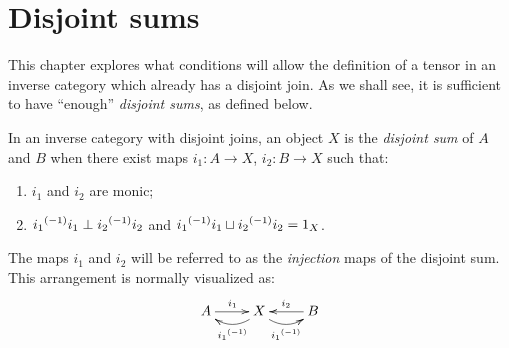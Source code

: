 \section{Disjoint sums} %
\label{sub:disjoint_sums}

This chapter explores what conditions will allow the definition of a  tensor in an inverse category
which already has a disjoint join. As we shall see, it is sufficient to have ``enough''
\emph{disjoint sums}, as defined below.

\begin{definition}\label{def:disjoint_sum}
  In an inverse category with disjoint joins, an object $X$ is the \emph{disjoint sum} of $A$ and
  $B$ when there exist maps $i_1 : A \to X$, $i_2: B \to X$ such that:
  \begin{enumerate}[{(}i{)}]
    \item $i_1$ and $i_2$ are monic;
    \item ${i_1}^{(-1)}i_1 \perp {i_2}^{(-1)}i_2$ and ${i_1}^{(-1)}i_1 \sqcup {i_2}^{(-1)}i_2 = 1_X$.
  \end{enumerate}
  The maps $i_1$ and $i_2$ will be referred to as the \emph{injection} maps of the disjoint
  sum. This arrangement is normally visualized as:
  \[
    \xymatrix{
      A\ar[r]^{i_1} &X\ar@/^9pt/[l]^{\inv{i_1}} \ar@/_9pt/[r]_{\inv{i_1}} & B \ar[l]_{i_2}
    }
   \]
\end{definition}

